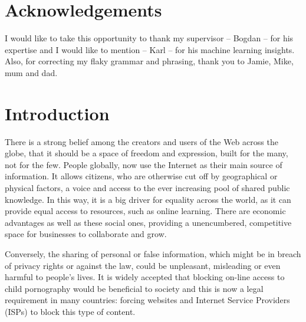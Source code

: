 \documentclass[ %
                    author={Samuel Russell},
                supervisor={Prof. Bogdan Warinschi},
                    degree={MEng},
                     title={Innocuous Ciphertexts},
                  subtitle={The DE-CENSOR Scheme},
                      type={Research},
                      year={2018} ]{dissertation}
\begin{document}

\chapter*{Acknowledgements}


I would like to take this opportunity to thank my supervisor -- Bogdan -- for his expertise and I would like to mention -- Karl -- for his machine learning insights. Also, for correcting my flaky grammar and phrasing, thank you to Jamie, Mike, mum and dad.


%

\mainmatter


\chapter{Introduction}
\label{chap:intro}

There is a strong belief among the creators and users of the Web across the globe, that it should be a space of freedom and expression, built for the many, not for the few.
People globally, now use the Internet as their main source of information.
It allows citizens, who are otherwise cut off by geographical or physical factors, a voice and access to the ever increasing pool of shared public knowledge.
In this way, it is a big driver for equality across the world, as it can provide equal access to resources, such as online learning.
There are economic advantages as well as these social ones, providing a unencumbered, competitive space for businesses to collaborate and grow.

Conversely, the sharing of personal or false information, which might be in breach of privacy rights or against the law, could be unpleasant, misleading or even harmful to people's lives.
It is widely accepted that blocking on-line access to child pornography would be beneficial to society and this is now a legal requirement in many countries: forcing websites and Internet Service Providers (ISPs) to block this type of content.
\end{document}
